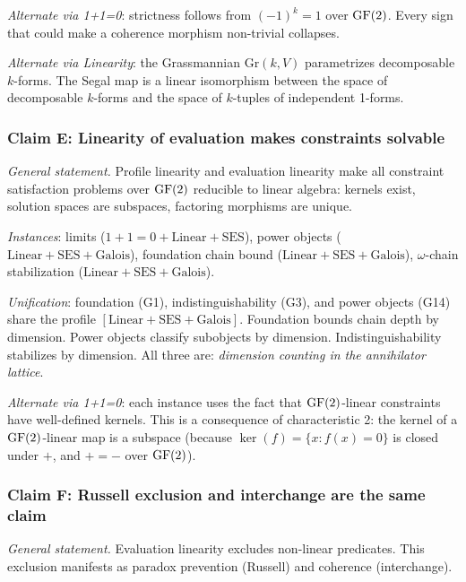 \emph{Alternate via 1+1=0}: strictness follows from
$(-1)^k = 1$ over $\operatorname{GF}(2)$. Every sign that could
make a coherence morphism non-trivial collapses.

\emph{Alternate via Linearity}: the Grassmannian
$\mathrm{Gr}(k, V)$ parametrizes decomposable
$k$-forms. The Segal map is a linear isomorphism
between the space of decomposable $k$-forms and
the space of $k$-tuples of independent 1-forms.

\subsubsection*{Claim E: Linearity of evaluation makes
  constraints solvable}

\emph{General statement.}
Profile linearity and evaluation linearity make all
constraint satisfaction problems over $\operatorname{GF}(2)$
reducible to linear algebra: kernels exist, solution
spaces are subspaces, factoring morphisms are unique.

\emph{Instances}: limits ($1{+}1{=}0{+}\mathrm{Linear}
{+}\mathrm{SES}$), power objects ($\mathrm{Linear}
{+}\mathrm{SES}{+}\mathrm{Galois}$), foundation chain
bound ($\mathrm{Linear}{+}\mathrm{SES}{+}\mathrm{Galois}$),
$\omega$-chain stabilization ($\mathrm{Linear}{+}
\mathrm{SES}{+}\mathrm{Galois}$).

\emph{Unification}: foundation (G1), indistinguishability
(G3), and power objects (G14) share the profile
$[\mathrm{Linear}{+}\mathrm{SES}{+}\mathrm{Galois}]$.
Foundation bounds chain depth by dimension. Power objects
classify subobjects by dimension. Indistinguishability
stabilizes by dimension. All three are:
\emph{dimension counting in the annihilator lattice}.

\emph{Alternate via 1+1=0}: each instance uses the
fact that $\operatorname{GF}(2)$-linear constraints have well-defined
kernels. This is a consequence of characteristic 2:
the kernel of a $\operatorname{GF}(2)$-linear map is a subspace
(because $\ker(f) = \{x : f(x) = 0\}$ is closed
under $+$, and $+ = -$ over $\operatorname{GF}(2)$).

\subsubsection*{Claim F: Russell exclusion and
  interchange are the same claim}

\emph{General statement.} Evaluation linearity excludes
non-linear predicates. This exclusion manifests as
paradox prevention (Russell) and coherence (interchange).

